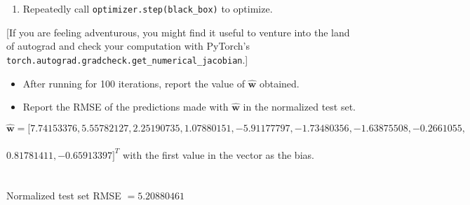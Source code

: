 \documentclass[submit]{harvardml}
\begin{document}
\begin{problem}[14pts]
\begin{enumerate}
\begin{verbatim}
    ...

    # Set the gradient of the variable.
    weights.grad = Tensor({numpy})

    return {objective}
\end{verbatim}

\item Repeatedly call \texttt{optimizer.step(black\_box)} to optimize.

\end{enumerate}

[If you are feeling adventurous, you might find it useful to venture
into the land of autograd and check your computation with PyTorch's
\texttt{torch.autograd.gradcheck.get\_numerical\_jacobian}.]

\begin{itemize}
\item After running for 100 iterations, report the value of $\hat{\mathbf{w}}$ obtained.
\item Report the RMSE of the predictions made with $\hat{\mathbf{w}}$ in the normalized test set.
\end{itemize}
\vspace{0.1cm}

\end{problem}






$\hat{\mathbf{w}}=[7.74153376,5.55782127,2.25190735,1.07880151,-5.91177797,-1.73480356,-1.63875508,-0.2661055,$\\\\
$0.81781411,-0.65913397]^T$ with the first value in the vector as the bias.\\\\\\
Normalized test set RMSE $=5.20880461$
\end{document}
